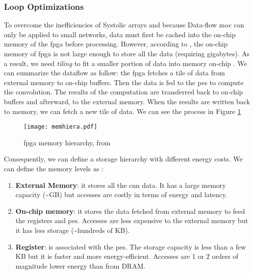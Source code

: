 \subsubsection{Loop Optimizations} \label{subsec:loopopti}
%
%
To overcome the inefficiencies of Systolic arrays and because Data-flow \acrshort{moc} can only be applied to small networks, data must first be cached into the on-chip memory of the \acrshort{fpga} before processing. However, according to \textcite{ma_optimizing_2018}, the on-chip memory of \acrshort{fpga} is not large enough to store all the data (requiring gigabytes). As a result, we need \textit{tiling} to fit a smaller portion of data into memory on-chip \cite{zhang_optimizing_2015}. We can summarize the dataflow as follow: the \acrshort{fpga} fetches a tile of data from external memory to on-chip buffers. Then the data is fed to the \acrshort{pe}s to compute the convolution. The results of the computation are transferred back to on-chip buffers and afterward, to the external memory. When the results are written back to memory, we can fetch a new tile of data. We can see the process in Figure \ref{fig:hierarchy}
%
\begin{figure}[H]
    \centering
    \texttt{[image: memhiera.pdf]}
    \caption{\acrshort{fpga} memory hierarchy, from \cite{ma_optimizing_2018}}
    \label{fig:hierarchy}
\end{figure}

Consequently, we can define a storage hierarchy with different energy costs. We can define the memory levels as \cite{sze_efficient_2017, horowitz_11_2014}:
%
\begin{enumerate}
    \item \textbf{External Memory}: it stores all the \acrshort{cnn} data. It has a large memory capacity (\textasciitilde GB) but accesses are costly in terms of energy and latency.
    \item \textbf{On-chip memory}: it stores the data fetched from external memory to feed the registers and \acrshort{pe}s. Accesses are less expensive to the external memory but it has less storage (\textasciitilde hundreds of KB).
    \item \textbf{Register}: is associated with the \acrshort{pe}s. The storage capacity is less than a few KB but it is faster and more energy-efficient. Accesses are 1 or 2 orders of magnitude lower energy than from DRAM.
\end{enumerate}

